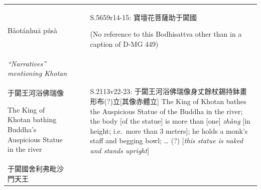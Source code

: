 \documentclass[
  english,
  a4paper,
  DIV=12,
  footlines=2.1,
  usegeometry=true]{scrartcl}
\begin{document}
\begin{longtable}[]{@{}llll@{}}
\begin{minipage}[t]{0.18\columnwidth}
Bǎotánhuā púsà\strut
\end{minipage} & \begin{minipage}[t]{0.13\columnwidth}\raggedright
\strut
\end{minipage} & \begin{minipage}[t]{0.13\columnwidth}\raggedright
\strut
\end{minipage} & \begin{minipage}[t]{0.44\columnwidth}\raggedright
S.5659r14-15: 寶壇花菩薩助于闐國

(No reference to this Bodhisattva other than in a caption of D-MG
449)\strut
\end{minipage}\tabularnewline
\begin{minipage}[t]{0.18\columnwidth}\raggedright
\emph{``Narratives'' mentioning Khotan}\strut
\end{minipage} & \begin{minipage}[t]{0.13\columnwidth}\raggedright
\strut
\end{minipage} & \begin{minipage}[t]{0.13\columnwidth}\raggedright
\strut
\end{minipage} & \begin{minipage}[t]{0.44\columnwidth}\raggedright
\strut
\end{minipage}\tabularnewline
\begin{minipage}[t]{0.18\columnwidth}\raggedright
于闐王河浴佛瑞像

The King of Khotan bathing Buddha's Auspicious Statue in the river\strut
\end{minipage} & \begin{minipage}[t]{0.13\columnwidth}\raggedright
\strut
\end{minipage} & \begin{minipage}[t]{0.13\columnwidth}\raggedright
\strut
\end{minipage} & \begin{minipage}[t]{0.44\columnwidth}\raggedright
S.2113v22-23: 于闐王河浴佛瑞像身丈餘杖錫持鉢畫形布(?)立{[}其像赤體立{]}
The King of Khotan bathes the Auspicious Statue of the Buddha in the
river; the body {[}of the statue{]} is more than {[}one{]} \emph{zhàng}
{[}in height; i.e.~more than 3 meters{]}; he holds a monk's staff and
begging bowl; \ldots{} (?) {[}\emph{this statue is naked and stands
upright}{]}\strut
\end{minipage}\tabularnewline
\begin{minipage}[t]{0.18\columnwidth}\raggedright
于闐國舍利弗毗沙門天王


\end{minipage}
\end{longtable}
\end{document}
